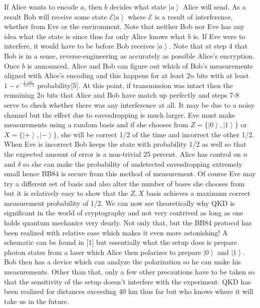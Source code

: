 \documentclass[aps,prd,final,twocolumn,letterpaper]{revtex4}
\newcommand{\ket}[1]{\left|#1\right\rangle}
\begin{document}
If Alice wants to encode $a$, then $b$ decides what state $\ket{a}$ Alice will send. As a result Bob will receive some state $\mathcal{E}\ket{a}$ where $\mathcal{E}$ is a result of interference, whether from Eve or the environment. Note that neither Bob nor Eve has any idea what the state is since thus far only Alice knows what $b$ is. If Eve were to interfere, it would have to be before Bob receives $\ket{a}$. Note that at step 4 that Bob is in a sense, reverse-engineering as accurately as possible Alice's encryption. Once $b$ is announced, Alice and Bob can figure out which of Bob's measurements aligned with Alice's encoding and this happens for at least $2n$ bits with at least $1-e^{-\frac{1}{2}\frac{n\delta}{\delta+4}}$ probability[5]. At this point, if transmission was intact then the remaining $2n$ bits that Alice and Bob have match up perfectly and steps 7-8 serve to check whether there was any interference at all. It may be due to a noisy channel but the effect due to eavesdropping is much larger. Eve must make measurements using a random basis and if she chooses from $Z=\{\ket{0},\ket{1}\}$ or $X=\{\ket{+},\ket{-}\}$, she will be correct 1/2 of the time and incorrect the other 1/2. When Eve is incorrect Bob keeps the state with probability 1/2 as well so that the expected amount of error is a non-trivial 25 percent. Alice has control on $n$ and $\delta$ so she can make the probability of undetected eavesdropping extremely small hence BB84 is secure from this method of measurement. Of course Eve may try a different set of basis and also alter the number of bases she chooses from but it is relatively easy to show that the $Z,X$ basis achieves a maximum correct measurement probability of 1/2. We can now see theoretically why QKD is significant in the world of cryptography and not very contrived as long as one holds quantum mechanics very dearly. Not only that, but the BB84 protocol has been realized with relative ease which makes it even more astonishing! A schematic can be found in [1] but essentially what the setup does is prepare photon states from a laser which Alice then polarizes to prepare $\ket{0}$ and $\ket{1}$. Bob then has a device which can analyze the polarization so he can make his measurements. Other than that, only a few other precautions have to be taken so that the sensitivity of the setup doesn't interfere with the experiment. QKD has been realized for distances exceeding 40 km thus far but who knows where it will take us in the future. 
\end{document}
